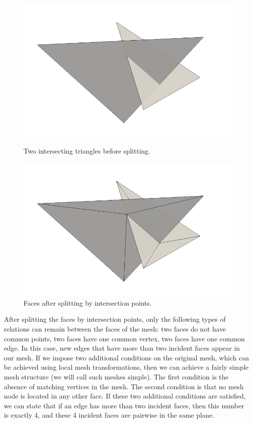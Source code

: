 \documentclass[
11pt,
tightenlines,
twoside,
onecolumn,
nofloats,
nobibnotes,
nofootinbib,
superscriptaddress,
noshowpacs,
centertags]
{revtex4-2}
\begin{document}
\begin{figure}[h]
  \centering
  \begin{minipage}[h]{0.38\textwidth}
    \includegraphics[width=\textwidth]{pics/pic_before_cut.png}
    \caption{Two intersecting triangles before splitting.}\label{fig:pic_before_cut}
  \end{minipage}
  \begin{minipage}[h]{0.38\textwidth}
    \includegraphics[width=\textwidth]{pics/pic_after_cut.png}
    \caption{Faces after splitting by intersection points.}\label{fig:pic_after_cut}
  \end{minipage}
\end{figure}

After splitting the faces by intersection points, only the following types of relations can remain between the faces of the mesh: two faces do not have common points, two faces have one common vertex, two faces have one common edge.
In this case, new edges that have more than two incident faces appear in our mesh.
If we impose two additional conditions on the original mesh, which can be achieved using local mesh transformations, then we can achieve a fairly simple mesh structure (we will call such meshes simple).
The first condition is the absence of matching vertices in the mesh.
The second condition is that no mesh node is located in any other face.
If these two additional conditions are satisfied, we can state that if an edge has more than two incident faces, then this number is exactly 4, and these 4 incident faces are pairwise in the same plane.
\end{document}
